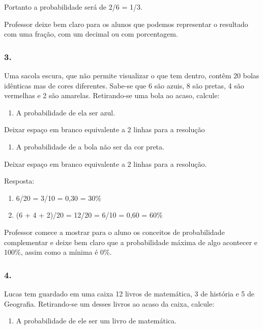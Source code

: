 Portanto a probabilidade será de 2/6 = 1/3.

Professor deixe bem claro para os alunos que podemos representar o
resultado com uma fração, com um decimal ou com porcentagem.

\subsubsection{3.}\label{section-97}

Uma sacola escura, que não permite visualizar o que tem dentro, contêm
20 bolas idênticas mas de cores diferentes. Sabe-se que 6 são azuis, 8
são pretas, 4 são vermelhas e 2 são amarelas. Retirando-se uma bola ao
acaso, calcule:

\begin{enumerate}
\def\labelenumi{\alph{enumi})}
\item
  A probabilidade de ela ser azul.
\end{enumerate}

Deixar espaço em branco equivalente a 2 linhas para a resolução

\begin{enumerate}
\def\labelenumi{\alph{enumi})}
\item
  A probabilidade de a bola não ser da cor preta.
\end{enumerate}

Deixar espaço em branco equivalente a 2 linhas para a resolução.

Resposta:

\begin{enumerate}
\def\labelenumi{\alph{enumi})}
\item
  6/20 = 3/10 = 0,30 = 30\%
\item
  (6 + 4 + 2)/20 = 12/20 = 6/10 = 0,60 = 60\%
\end{enumerate}

Professor comece a mostrar para o aluno os conceitos de probabilidade
complementar e deixe bem claro que a probabilidade máxima de algo
acontecer e 100\%, assim como a mínima é 0\%.

\subsubsection{4.}\label{section-98}

Lucas tem guardado em uma caixa 12 livros de matemática, 3 de história e
5 de Geografia. Retirando-se um desses livros ao acaso da caixa,
calcule:

\begin{enumerate}
\def\labelenumi{\alph{enumi})}
\item
  A probabilidade de ele ser um livro de matemática.
\end{enumerate}

